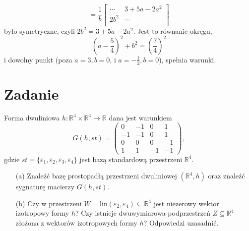 \documentclass[11pt]{scrartcl}
\begin{document}
\begin{walk}
\[                      =
                      \frac{1}{b}
                      \begin{bmatrix}
                          \cdots  & 3 + 5a - 2a^2 \\
                          2 b^2 & \cdots  \\
                      \end{bmatrix}
                  \]
                  było symetryczne, czyli $2b^2 = 3 + 5a - 2a^2$. Jest to równanie okręgu,
                  \[
                      \left ( a - \frac{5}{4} \right )^2 + b^2 = \left ( \frac{7}{4} \right )^2
                  \]
                  i dowolny punkt (poza $a = 3 , b = 0 $, i $a = - \frac{1}{2}, b = 0 $), spełnia warunki.
            \end{walk}
            \newpage
      \section{Zadanie}
          \begin{zadanie}
              Forma dwuliniowa $h : \mathbb{R}^4 \times \mathbb{R}^4 \to \mathbb{R}$ dana jest warunkiem
\[
G(h, st) = \begin{pmatrix}
0 & -1 & 0 & 1 \\
-1 & -1 & 0 & 1 \\
0 & 0 & 0 & -1 \\
1 & 1 & -1 & -1
\end{pmatrix},
\]
gdzie $st = \{\varepsilon_1, \varepsilon_2, \varepsilon_3, \varepsilon_4\}$ jest bazą standardową przestrzeni $\mathbb{R}^4$.

\begin{itemize}
    \item[(a)] Znaleźć bazę prostopadłą przestrzeni dwuliniowej $(\mathbb{R}^4, h)$ oraz znaleźć sygnaturę macierzy $G(h, st)$.
    \item[(b)] Czy w przestrzeni $W = \text{lin}(\varepsilon_2, \varepsilon_4) \subseteq \mathbb{R}^4$ jest niezerowy wektor izotropowy formy $h$? Czy istnieje dwuwymiarowa podprzestrzeń $Z \subseteq \mathbb{R}^4$ złożona z wektorów izotropowych formy $h$? Odpowiedzi uzasadnić.
\end{itemize}
          \end{zadanie}
\end{document}

